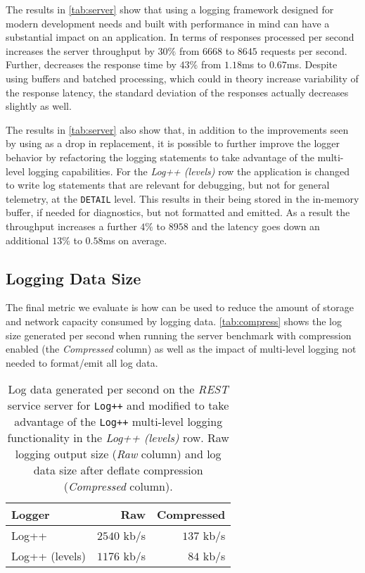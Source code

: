 The results in \autoref{tab:server} show that using a logging framework designed 
for modern development needs and built with performance in mind can have a 
substantial impact on an application. In terms of responses processed per second 
\projn increases the server throughput by $30\%$ from $6668$ to $8645$ requests 
per second. Further, \projn decreases the response time by $43\%$ 
from $1.18$ms to $0.67$ms. Despite using buffers and batched processing, 
which could in theory increase variability of the response latency, the standard deviation of 
the responses actually decreases slightly as well.

The results in \autoref{tab:server} also show that, in addition to the improvements 
seen by using \projn as a drop in replacement, it is possible to further improve the 
logger behavior by refactoring the logging statements to take advantage of the 
multi-level logging capabilities. For the \emph{Log++ (levels)} row the application is 
changed to write log statements that are relevant for debugging, but not for general 
telemetry, at the \texttt{DETAIL} level. This results in their being stored in 
the in-memory buffer, if needed for diagnostics, but not formatted and emitted. As 
a result the throughput increases a further $4\%$ to $8958$ and the latency goes 
down an additional $13\%$ to $0.58$ms on average.

\subsection{Logging Data Size}
The final metric we evaluate is how \projn can be used to reduce the amount of 
storage and network capacity consumed by logging data. \autoref{tab:compress} 
shows the log size generated per second when running the server benchmark with compression 
enabled (the \emph{Compressed} column) as well as the impact of multi-level 
logging not needed to format/emit all log data.

\begin{table}[t]  
    \centering
    \caption{\small Log data generated per second on the \emph{REST} service server for \texttt{Log++}
    and modified to take advantage of the \texttt{Log++} 
    multi-level logging functionality in the \emph{Log++ (levels)} row. Raw 
    logging output size (\emph{Raw} column) and log data size after deflate 
    compression (\emph{Compressed} column).}
    {\small
    \begin{tabular}{l | r r }
    Logger        & Raw & Compressed \\
    \hline
    Log++          & $2540$ kb/s & $137$ kb/s \\
    Log++ (levels) & $1176$ kb/s & $84$ kb/s   \\
    \end{tabular}
    }
    \label{tab:compress}
\end{table}

